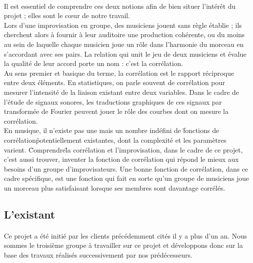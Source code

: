 \paragraph{}
Il est essentiel de comprendre ces deux notions afin de bien situer
l'intérêt du projet ; elles sont le c\oe ur de notre travail. \\ Lors
d'une improvisation en groupe, des musiciens jouent sans règle établie
; ils cherchent alors à fournir à leur auditoire une production
cohérente, ou du moins au sein de laquelle chaque musicien joue un
rôle dans l'harmonie du morceau en s'accordant avec ses pairs. La
relation qui unit le jeu de deux musiciens et évalue la qualité de
leur accord porte un nom : c'est la corrélation. \\
Au sens premier et basique du terme, la corrélation est le rapport
réciproque entre deux éléments. En statistiques, on parle souvent de
corrélation pour mesurer l'intensité de la liaison existant entre deux
variables. Dans le cadre de l'étude de signaux sonores, les
traductions graphiques de ces signaux par transformée de Fourier
peuvent jouer le rôle des courbes dont on mesure la corrélation. \\
En musique, il n'existe pas une mais un nombre indéfini de \"fonctions
de corrélation\" potentiellement existantes, dont la complexité et les
paramètres varient. \" Comprendre\" la corrélation et l'improvisation,
dans le cadre de ce projet, c'est aussi trouver, inventer la fonction
de corrélation qui répond le mieux aux besoins d'un groupe
d'improvisateurs. Une bonne fonction de corrélation, dans ce cadre
spécifique, est une fonction qui fait en sorte qu'un groupe de
musiciens joue un morceau plus satisfaisant lorsque ses membres sont
davantage corrélés. \\

\subsection{L'existant}
\paragraph{}
Ce projet a été initié par les clients précédemment cités il y a plus
d'un an. Nous sommes le troisième groupe à travailler sur ce projet et
développons donc sur la base des travaux réalisés successivement par
nos prédécesseurs.

